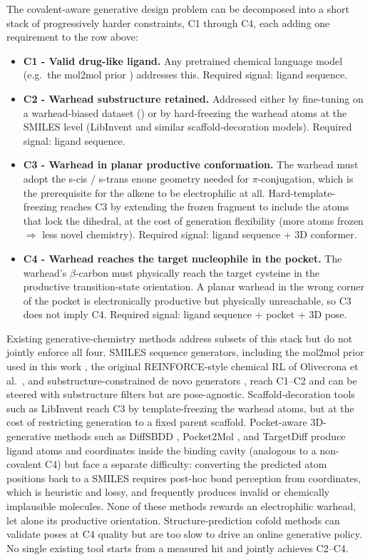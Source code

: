 The covalent-aware generative design problem can be decomposed into a short stack of progressively harder constraints, C1 through C4, each adding one requirement to the row above:
\begin{itemize}
  \item \textbf{C1 - Valid drug-like ligand.} Any pretrained chemical language model (e.g.\ the mol2mol prior \cite{loeffler2024reinvent4}) addresses this. Required signal: ligand sequence.
  \item \textbf{C2 - Warhead substructure retained.} Addressed either by fine-tuning on a warhead-biased dataset (\Cvcovaft{}) or by hard-freezing the warhead atoms at the SMILES level (LibInvent \cite{fialkova2022libinvent} and similar scaffold-decoration models). Required signal: ligand sequence.
  \item \textbf{C3 - Warhead in planar productive conformation.} The warhead must adopt the s-cis / s-trans enone geometry needed for $\pi$-conjugation, which is the prerequisite for the alkene to be electrophilic at all. Hard-template-freezing reaches C3 by extending the frozen fragment to include the atoms that lock the dihedral, at the cost of generation flexibility (more atoms frozen $\Rightarrow$ less novel chemistry). Required signal: ligand sequence + 3D conformer.
  \item \textbf{C4 - Warhead reaches the target nucleophile in the pocket.} The warhead's $\beta$-carbon must physically reach the target cysteine in the productive transition-state orientation. A planar warhead in the wrong corner of the pocket is electronically productive but physically unreachable, so C3 does not imply C4. Required signal: ligand sequence + pocket + 3D pose.
\end{itemize}

Existing generative-chemistry methods address subsets of this stack but do not jointly enforce all four. SMILES sequence generators, including the mol2mol prior used in this work \cite{loeffler2024reinvent4}, the original REINFORCE-style chemical RL of Olivecrona et al.\ \cite{olivecrona2017reinvent}, and substructure-constrained de novo generators \cite{blaschke2020reinvent2}, reach C1--C2 and can be steered with substructure filters but are pose-agnostic. Scaffold-decoration tools such as LibInvent \cite{fialkova2022libinvent} reach C3 by template-freezing the warhead atoms, but at the cost of restricting generation to a fixed parent scaffold. Pocket-aware 3D-generative methods such as DiffSBDD \cite{schneuing2024diffsbdd}, Pocket2Mol \cite{peng2022pocket2mol}, and TargetDiff \cite{guan2023targetdiff} produce ligand atoms and coordinates inside the binding cavity (analogous to a non-covalent C4) but face a separate difficulty: converting the predicted atom positions back to a SMILES requires post-hoc bond perception from coordinates, which is heuristic and lossy, and frequently produces invalid or chemically implausible molecules. None of these methods rewards an electrophilic warhead, let alone its productive orientation. Structure-prediction cofold methods \cite{passaro2025boltz2} can validate poses at C4 quality but are too slow to drive an online generative policy. No single existing tool starts from a measured hit and jointly achieves C2--C4.

